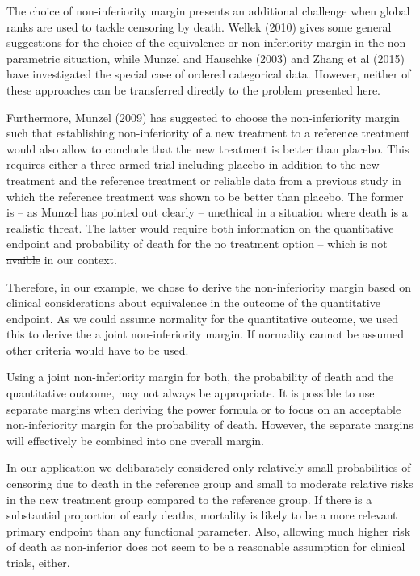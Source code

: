 \documentclass[bimj,fleqn]{w-art}\usepackage[]{graphicx}\usepackage[]{color}
\theoremstyle{plain}
\theoremstyle{definition}
\providecommand{\DIFadd}[1]{{\protect\color{blue}\uwave{#1}}} %
\providecommand{\DIFdel}[1]{{\protect\color{red}\sout{#1}}}                      %
\providecommand{\DIFaddbegin}{} %
\providecommand{\DIFaddend}{} %
\providecommand{\DIFdelbegin}{} %
\providecommand{\DIFdelend}{} %
\newcommand{\DIFscaledelfig}{0.5}
\newlength{\DIFdelgraphicswidth} %
\newlength{\DIFdelgraphicsheight} %
\newcommand{\DIFaddincludegraphics}[2][]{{\color{blue}\fbox{\DIFOincludegraphics[#1]{#2}}}} %
\newcommand{\DIFdelincludegraphics}[2][]{%
\sbox{\DIFdelgraphicsbox}{\DIFOincludegraphics[#1]{#2}}%
\settoboxwidth{\DIFdelgraphicswidth}{\DIFdelgraphicsbox} %
\settoboxtotalheight{\DIFdelgraphicsheight}{\DIFdelgraphicsbox} %
\scalebox{\DIFscaledelfig}{%
\parbox[b]{\DIFdelgraphicswidth}{\usebox{\DIFdelgraphicsbox}\\[-\baselineskip] \rule{\DIFdelgraphicswidth}{0em}}\llap{\resizebox{\DIFdelgraphicswidth}{\DIFdelgraphicsheight}{%
\setlength{\unitlength}{\DIFdelgraphicswidth}%
\begin{picture}(1,1)%
\thicklines\linethickness{2pt} %
{\color[rgb]{1,0,0}\put(0,0){\framebox(1,1){}}}%
{\color[rgb]{1,0,0}\put(0,0){\line( 1,1){1}}}%
{\color[rgb]{1,0,0}\put(0,1){\line(1,-1){1}}}%
\end{picture}%
}\hspace*{3pt}}} %
} %
\DeclareRobustCommand{\DIFaddbegin}{\DIFOaddbegin \let\includegraphics\DIFaddincludegraphics} %
\DeclareRobustCommand{\DIFaddend}{\DIFOaddend \let\includegraphics\DIFOincludegraphics} %
\DeclareRobustCommand{\DIFdelbegin}{\DIFOdelbegin \let\includegraphics\DIFdelincludegraphics} %
\DeclareRobustCommand{\DIFdelend}{\DIFOaddend \let\includegraphics\DIFOincludegraphics} %
\begin{document}
The choice of non-inferiority margin presents an additional challenge when global
ranks are used to tackle censoring by death. Wellek (2010) gives some general
suggestions for the choice of the equivalence or non-inferiority margin in the
non-parametric situation, while Munzel and Hauschke (2003) and Zhang et al (2015)
have investigated the special case of ordered categorical data. However, neither
of these approaches can be transferred directly to the problem presented here.

Furthermore, Munzel (2009) has suggested to choose the non-inferiority margin
such that establishing non-inferiority of a new treatment to a reference
treatment would also allow to conclude that the new treatment is better than
placebo. This requires either a three-armed trial including placebo in addition
to the new treatment and the reference treatment or reliable data from a previous
study in which the reference treatment was shown to be better than placebo.
The former is -- as Munzel has pointed out clearly -- unethical in a situation
where death is a realistic threat. The latter would require both information on
the quantitative endpoint and probability of death for the no treatment option --
which is not \DIFdelbegin \DIFdel{avaible }\DIFdelend \DIFaddbegin \DIFadd{available }\DIFaddend in our context.

Therefore, in our example, we chose to derive the non-inferiority margin based
on clinical considerations about equivalence in the outcome of the quantitative
endpoint. As we could assume normality for the quantitative outcome, we used this
to derive the a joint non-inferiority margin. If normality cannot be assumed
other criteria would have to be used.

Using a joint non-inferiority margin for both, the probability of death and the
quantitative outcome, may not always be appropriate. It is possible to use
separate margins when deriving the power formula or to focus on an acceptable
non-inferiority margin for the probability of death. However, the separate
margins will effectively be combined into one overall margin.

In our application we delibarately considered only relatively small probabilities
of censoring due to death in the reference group and small to moderate relative
risks in the new treatment group compared to the reference group. If there is a
substantial proportion of early deaths, mortality is likely to be a more relevant
primary endpoint than any functional parameter. Also, allowing much higher risk
of death as non-inferior does not seem to be a reasonable assumption for clinical
trials, either.
\end{document}
